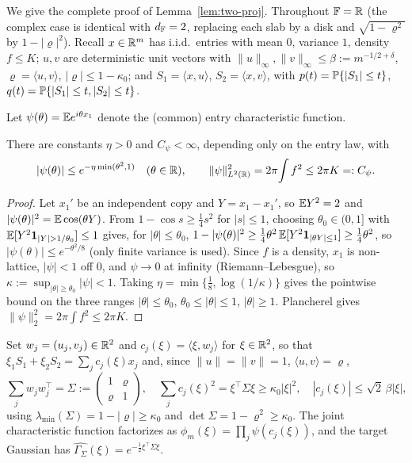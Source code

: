 
We give the complete proof of Lemma~\ref{lem:two-proj}.  Throughout $\mathbb{F}=\mathbb{R}$ (the complex case is
identical with $d_{\mathbb{F}}=2$, replacing each slab by a disk and $\sqrt{1-\varrho^2}$ by $1-|\varrho|^2$).
Recall $x\in\mathbb{R}^m$ has i.i.d.\ entries with mean $0$, variance $1$, density $f\le K$; $u,v$ are
deterministic unit vectors with $\|u\|_\infty,\|v\|_\infty\le\beta:=m^{-1/2+\delta}$,
$\varrho=\langle u,v\rangle$, $|\varrho|\le1-\kappa_0$; and $S_1=\langle x,u\rangle$,
$S_2=\langle x,v\rangle$, with $p(t)=\mathbb{P}\{|S_1|\le t\}$, $q(t)=\mathbb{P}\{|S_1|\le t,|S_2|\le t\}$.

Let $\psi(\theta)=\mathbb{E} e^{i\theta x_1}$ denote the (common) entry characteristic function.

\begin{lemma}\label{app:cf}
There are constants $\eta>0$ and $C_\psi<\infty$, depending only on the entry law, with
\[
  |\psi(\theta)|\le e^{-\eta\min(\theta^2,1)}\quad(\theta\in\mathbb{R}),
  \qquad \|\psi\|_{L^2(\mathbb{R})}^2=2\pi\!\int f^2\le 2\pi K=:C_\psi .
\]
\end{lemma}
\begin{proof}
Let $x_1'$ be an independent copy and $Y=x_1-x_1'$, so $\mathbb{E} Y^2=2$ and
$|\psi(\theta)|^2=\mathbb{E}\cos(\theta Y)$.  From $1-\cos s\ge\tfrac14 s^2$ for $|s|\le1$, choosing
$\theta_0\in(0,1]$ with $\EE[Y^2\mathbf 1_{|Y|>1/\theta_0}]\le1$ gives, for $|\theta|\le\theta_0$,
$1-|\psi(\theta)|^2\ge\tfrac14\theta^2\,\mathbb{E}[Y^2\mathbf 1_{|\theta Y|\le1}]\ge\tfrac14\theta^2$,
so $|\psi(\theta)|\le e^{-\theta^2/8}$ (only finite variance is used).  Since $f$ is a density,
$x_1$ is non-lattice, $|\psi|<1$ off $0$, and $\psi\to0$ at infinity (Riemann--Lebesgue), so
$\kappa:=\sup_{|\theta|\ge\theta_0}|\psi|<1$.  Taking $\eta=\min\{\tfrac18,\log(1/\kappa)\}$ gives
the pointwise bound on the three ranges $|\theta|\le\theta_0$, $\theta_0\le|\theta|\le1$,
$|\theta|\ge1$.  Plancherel gives $\|\psi\|_2^2=2\pi\int f^2\le2\pi K$.
\end{proof}

Set $w_j=(u_j,v_j)\in\mathbb{R}^2$ and $c_j(\xi)=\langle\xi,w_j\rangle$ for $\xi\in\mathbb{R}^2$, so that
$\xi_1S_1+\xi_2S_2=\sum_jc_j(\xi)x_j$ and, since $\|u\|=\|v\|=1$, $\langle u,v\rangle=\varrho$,
\begin{equation}\label{app:frame}
  \sum_{j}w_jw_j^{\top}=\Sigma:=\begin{pmatrix}1&\varrho\\\varrho&1\end{pmatrix},\quad
  \sum_j c_j(\xi)^2=\xi^\top\Sigma\xi\ge\kappa_0|\xi|^2,\quad
  |c_j(\xi)|\le\sqrt2\,\beta|\xi|,
\end{equation}
using $\lambda_{\min}(\Sigma)=1-|\varrho|\ge\kappa_0$ and $\det\Sigma=1-\varrho^2\ge\kappa_0$.
The joint characteristic function factorizes as $\phi_m(\xi)=\prod_j\psi(c_j(\xi))$, and the
target Gaussian has $\widehat{\Gamma_\Sigma}(\xi)=e^{-\frac12\xi^\top\Sigma\xi}$.

